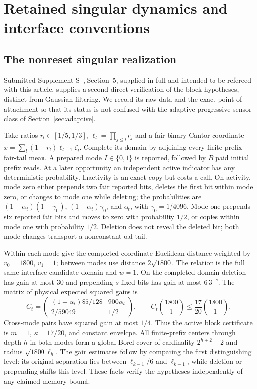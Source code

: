 \section{Retained singular dynamics and interface conventions}\label{sec:appendix}
\subsection{The nonreset singular realization}
Submitted Supplement S~\cite{companion}, Section~5, supplied in full and intended to be refereed with this article, supplies a second direct verification of the block hypotheses, distinct from Gaussian filtering. We record its raw data and the exact point of attachment so that its status is not confused with the adaptive progressive-sensor class of Section~\ref{sec:adaptive}.

Take ratios $r_l\in[1/5,1/3]$, $\ell_l=\prod_{j\le l}r_j$ and a fair binary Cantor coordinate $x=\sum_l(1-r_l)\ell_{l-1}\zeta_l$. Complete its domain by adjoining every finite-prefix fair-tail mean. A prepared mode $I\in\{0,1\}$ is reported, followed by $B$ paid initial prefix reads. At a later opportunity an independent active indicator has any deterministic probability. Inactivity is an exact copy but costs a call. On activity, mode zero either prepends two fair reported bits, deletes the first bit within mode zero, or changes to mode one while deleting; the probabilities are $(1-\alpha_t)(1-\gamma_0)$, $(1-\alpha_t)\gamma_0$, and $\alpha_t$, with $\gamma_0=1/4096$. Mode one prepends six reported fair bits and moves to zero with probability $1/2$, or copies within mode one with probability $1/2$. Deletion does not reveal the deleted bit; both mode changes transport a nonconstant old tail.

Within each mode give the completed coordinate Euclidean distance weighted by $v_0=1800$, $v_1=1$; between modes use distance $2\sqrt{1800}$. The relation is the full same-interface candidate domain and $w=1$. On the completed domain deletion has gain at most $30$ and prepending $s$ fixed bits has gain at most $6\,3^{-s}$. The matrix of physical expected squared gains is
\[
 C_t=\begin{pmatrix}(1-\alpha_t)85/128&900\alpha_t\\2/59049&1/2\end{pmatrix},
 \qquad C_t\binom{1800}{1}\le\frac{17}{20}\binom{1800}{1}.
\]
Cross-mode pairs have squared gain at most $1/4$. Thus the active block certificate is $m=1$, $\kappa=17/20$, and constant envelope. All finite-prefix centers through depth $h$ in both modes form a global Borel cover of cardinality $2^{h+2}-2$ and radius $\sqrt{1800}\ell_h$. The gain estimates follow by comparing the first distinguishing level: its original separation lies between $\ell_{k-1}/6$ and $\ell_{k-1}$, while deletion or prepending shifts this level. These facts verify the hypotheses independently of any claimed memory bound.

